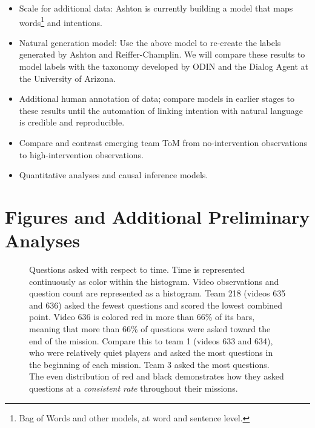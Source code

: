 \begin{itemize}
    \item Scale for additional data: Ashton is currently building a model that maps words\footnote{Bag of Words and other models, at word and sentence level.} and intentions.
    \item Natural generation model: Use the above model to re-create the labels
        generated by Ashton and Reiffer-Champlin. We will compare these results
        to model labels with the taxonomy developed by ODIN and the Dialog
        Agent at the University of Arizona.
    \item Additional human annotation of data; compare models in earlier stages to these results until the automation of linking intention with natural language is credible and reproducible.
    \item Compare and contrast emerging team ToM from no-intervention observations to high-intervention observations.
    \item Quantitative analyses and causal inference models.
\end{itemize}



\section{Figures and Additional Preliminary Analyses}

\begin{figure}[h!]
    \centering
    \caption{%
        Questions asked with respect to time. Time is represented continuously
        as color within the histogram. Video observations and question count
        are represented as a histogram. Team 218 (videos 635 and 636) asked the
        fewest questions and scored the lowest combined point. Video 636 is
        colored red in more than 66\% of its bars, meaning that more than 66\%
        of questions were asked toward the end of the mission. Compare this to
        team 1 (videos 633 and 634), who were relatively quiet players and
        asked the most questions in the beginning of each mission. Team 3 asked
        the most questions. The even distribution of red and black demonstrates
        how they asked questions at a \emph{consistent rate} throughout their
        missions.
    }
    \end{figure}
    
